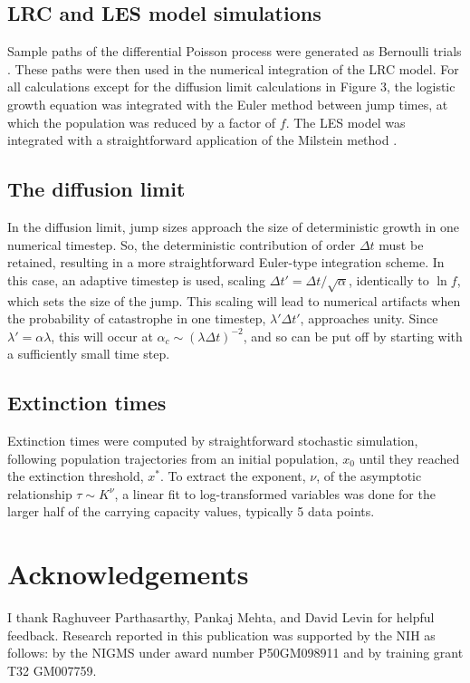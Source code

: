 \subsection{LRC and LES model simulations}Sample paths of the differential Poisson process were generated as Bernoulli trials \cite{hansonBook}.  These paths were then used in the numerical integration of the LRC model.  For all calculations except for the diffusion limit calculations in Figure 3, the logistic growth equation was integrated with the Euler method between jump times, at which the population was reduced by a factor of $f$.  The LES model was integrated with a straightforward application of the Milstein method \cite{mil1975approximate}.

\subsection{The diffusion limit}
In the diffusion limit, jump sizes approach the size of deterministic growth in one numerical timestep.  So, the deterministic contribution of order $\Delta t$ must be retained, resulting in a more straightforward Euler-type integration scheme.  In this case, an adaptive timestep is used, scaling $\Delta t' = \Delta t/\sqrt{\alpha}$, identically to $\ln f$, which sets the size of the jump.  This scaling will lead to numerical artifacts when the probability of catastrophe in one timestep, $\lambda'\Delta t'$, approaches unity.   Since $\lambda' = \alpha \lambda$, this will occur at $\alpha_c \sim (\lambda\Delta t)^{-2}$, and so can be put off by starting with a sufficiently small time step.  

\subsection{Extinction times}
Extinction times were computed by straightforward stochastic simulation, following population trajectories from an initial population, $x_0$ until they reached the extinction threshold, $x^*$.  To extract the exponent, $\nu$, of the asymptotic relationship $\tau \sim K^{\nu}$, a linear fit to log-transformed variables was done for the larger half of the carrying capacity values, typically 5 data points. 
 

\section{Acknowledgements}
I thank Raghuveer Parthasarthy, Pankaj Mehta, and David Levin for helpful feedback.  Research reported in this publication was supported by the NIH as follows: by the NIGMS under award number P50GM098911 and by training grant T32 GM007759.




